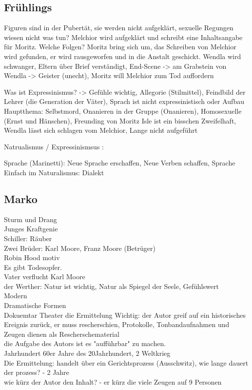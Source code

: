 \documentclass[a4paper]{article}
\begin{document}
\subsection{Frühlings}

Figuren 
sind in der Pubertät, sie werden nicht aufgeklärt, sexuelle Regungen wiesen nicht was tun?
Melchior wird aufgeklärt und schreibt eine Inhaltsangabe für Moritz. Welche Folgen? Moritz bring sich um, das Schreiben von Melchior wird gefunden, er wird rausgeworfen und in die Anstalt geschickt.
Wendla wird schwanger, Eltern über Brief verständigt,
End-Scene -> am Grabstein von Wendla -> Geister (unecht), Moritz will Melchior zum Tod auffordern

Was ist Expressinismus? -> Gefühle wichtig, Allegorie (Stilmittel), Feindbild der Lehrer (die Generation der Väter), Sprach ist nicht expressinistisch oder Aufbau
Hauptthema: Selbstmord, Onanieren in der Gruppe (Onanieren), Homosexuelle (Ernst und Hänschen), Freunding von Moritz Isle ist ein bisschen Zweifelhaft, Wendla lässt sich schlagen vom Melchior, Lange nicht aufgeführt

Natrualismus / Expressinismsus :

Sprache (Marinetti): Neue Sprache erschaffen, Neue Verben schaffen, 
Sprache Einfach im Naturalismus: Dialekt

\subsection{Marko}
Sturm und Drang\\
Junges Kraftgenie\\
Schiller: Räuber\\
Zwei Brüder: Karl Moore, Franz Moore (Betrüger)\\
Robin Hood motiv\\
Es gibt Todesopfer.\\
Vater verflucht Karl Moore\\
der Werther: Natur ist wichtig, Natur als Spiegel der Seele, Gefühlswert\\
Modern\\
Dramatische Formen\\
Dokuemtar Theater die Ermittelung
Wichtig: der Autor greif auf ein historisches Ereignis zurück, er muss rescherschien, Protokolle, Tonbandaufnahmen und Zeugen dienen als Rescherschematerial\\
die Aufgabe des Autors ist es "aufführbar" zu machen.\\
Jahrhundert 60er Jahre des 20Jahrhundert, 2 Weltkrieg\\
Die Ermittelung: handelt über ein Gerichtsprozess (Ausschwitz), wie lange dauert der prozess? - 2 Jahre\\
wie kürz der Autor den Inhalt? - er kürz die viele Zeugen auf 9 Personen
\end{document}
